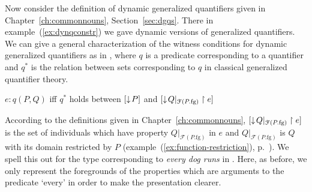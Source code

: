 Now consider the definition of dynamic generalized quantifiers given
in Chapter~\ref{ch:commonnouns}, Section~\ref{sec:dgqs}.  There in
example~(\ref{ex:dynqconstr}) we gave dynamic versions of generalized
quantifiers.  We can give a general characterization of the witness
conditions for dynamic generalized quantifiers as in \nexteg{}, where
$q$ is a predicate corresponding to a quantifier and $q^*$ is the
relation between sets corresponding to $q$ in classical generalized
quantifier theory.
\begin{ex} 
$e:q(P,Q)$ iff $q^*$ holds between $[\downarrow\!P]$ and
$[\downarrow\!Q|_{\mathcal{F}(P.\mathrm{fg})}\restriction e]$
\label{ex:witness-cond-GQ}
\end{ex} 
According to the definitions given in Chapter~\ref{ch:commonnouns},
$[\downarrow\!Q|_{\mathcal{F}(P.\mathrm{fg})}\restriction e]$ is the set of
individuals which have property $Q|_{\mathcal{F}(P.\mathrm{fg})}$ in
$e$ and $Q|_{\mathcal{F}(P.\mathrm{fg})}$ is $Q$ with its
domain restricted by $P$ (example~(\ref{ex:function-restriction}), p.~\pageref{ex:function-restriction}).  We spell this out for the type
corresponding to \textit{every dog runs} in \nexteg{}.  Here, as
before, we only represent the foregrounds of the properties which are
arguments to the predicate `every' in order to make the presentation
clearer.    

